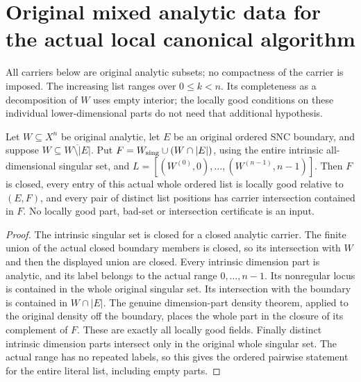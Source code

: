 \section{Original mixed analytic data for the actual local canonical algorithm}

All carriers below are original analytic subsets; no compactness of the
carrier is imposed. The increasing list ranges over $0\le k<n$.
Its completeness as a decomposition of $W$ uses empty interior; the
locally good conditions on these individual lower-dimensional parts
do not need that additional hypothesis.

\begin{lemma}
\label{hir:original-local-nonpure-intrinsic-input}
\leanok
Let $W\subseteq X^n$ be original analytic, let $E$ be an original
ordered SNC boundary, and suppose $W\subseteq\overline{W\setminus|E|}$.
Put $F=W_{\rm sing}\cup(W\cap|E|)$, using the entire intrinsic
all-dimensional singular set, and
$L=[(W^{(0)},0),\ldots,(W^{(n-1)},n-1)]$.
Then $F$ is closed, every entry of this actual whole ordered list is
locally good relative to $(E,F)$, and every pair of distinct list
positions has carrier intersection contained in $F$. No locally good
part, bad-set or intersection certificate is an input.
\end{lemma}
\begin{proof}
The intrinsic singular set is closed for a closed analytic carrier.
The finite union of the actual closed boundary members is closed,
so its intersection with $W$ and then the displayed union are closed.
Every intrinsic dimension part is analytic, and its label belongs
to the actual range $0,\ldots,n-1$. Its nonregular locus is contained
in the whole original singular set. Its intersection with the boundary
is contained in $W\cap|E|$. The genuine dimension-part density theorem,
applied to the original density off the boundary, places the whole
part in the closure of its complement of $F$. These are exactly all
locally good fields. Finally distinct intrinsic dimension parts
intersect only in the original whole singular set. The actual range
has no repeated labels, so this gives the ordered pairwise statement
for the entire literal list, including empty parts.
\end{proof}

